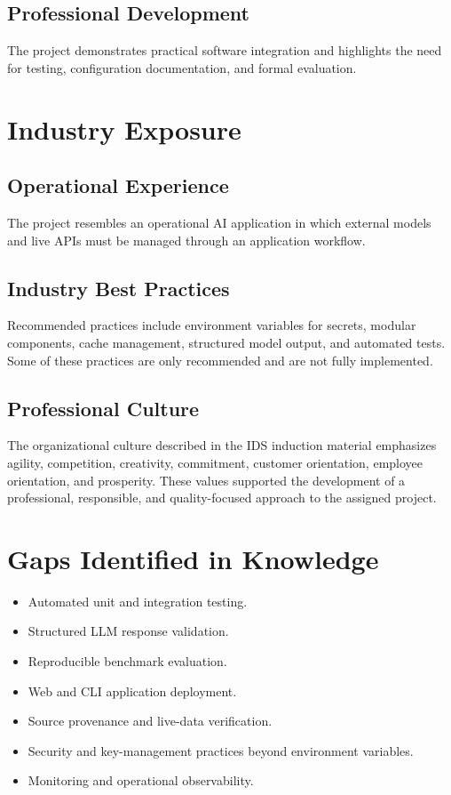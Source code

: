 \documentclass[12pt,a4paper]{report}
\begin{document}
\subsection{Professional Development}
\label{subsec:professional-development}
The project demonstrates practical software integration and highlights the need for testing,
configuration documentation, and formal evaluation.

\section{Industry Exposure}
\label{sec:industry-exposure}

\subsection{Operational Experience}
\label{subsec:operational-experience}
The project resembles an operational AI application in which external models and live APIs must
be managed through an application workflow.

\subsection{Industry Best Practices}
\label{subsec:industry-best-practices}
Recommended practices include environment variables for secrets, modular components, cache
management, structured model output, and automated tests. Some of these practices are only
recommended and are not fully implemented.

\subsection{Professional Culture}
\label{subsec:professional-culture}
The organizational culture described in the IDS induction material emphasizes agility,
competition, creativity, commitment, customer orientation, employee orientation, and prosperity.
These values supported the development of a professional, responsible, and quality-focused
approach to the assigned project.

\section{Gaps Identified in Knowledge}
\label{sec:knowledge-gaps}
\begin{itemize}
    \item Automated unit and integration testing.
    \item Structured LLM response validation.
    \item Reproducible benchmark evaluation.
    \item Web and CLI application deployment.
    \item Source provenance and live-data verification.
    \item Security and key-management practices beyond environment variables.
    \item Monitoring and operational observability.
\end{itemize}
\end{document}
